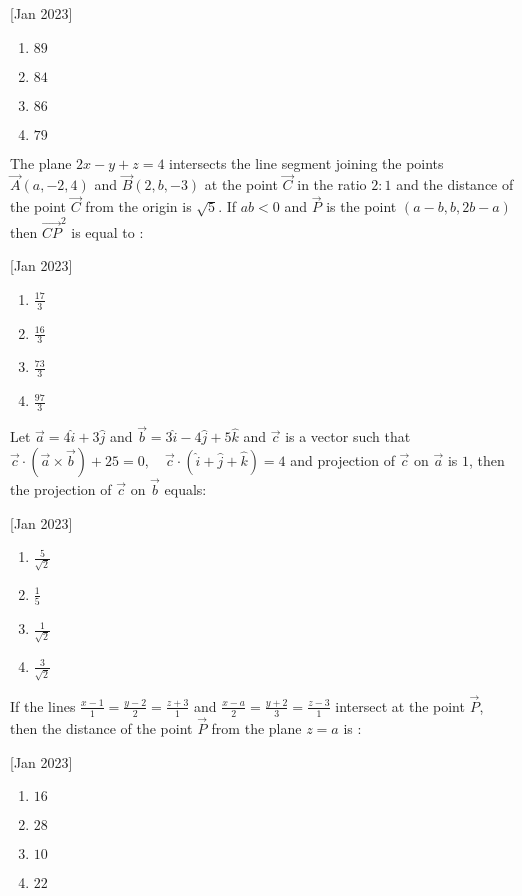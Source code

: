     \hfill[Jan 2023]
        \begin{enumerate}
            \item $89$
            \item $84$
            \item $86$
            \item $79$
        \end{enumerate}

    \item The plane $2x-y+z=4$ intersects the line segment joining the points $\vec{A}(a, -2, 4)$ and $\vec{B}(2, b, -3)$ at the point $\vec{C}$ in the ratio $2:1$ and the distance of the point $\vec{C}$ from the origin is $\sqrt{5}$. If $ab<0$ and $\vec{P}$ is the point $(a-b,b,2b-a)$ then $\vec{CP}^2$ is equal to :
    
    \hfill[Jan 2023]
        \begin{enumerate}
            \item $\frac{17}{3}$
            \item $\frac{16}{3}$
            \item $\frac{73}{3}$
            \item $\frac{97}{3}$
        \end{enumerate}

    \item Let $\vec{a} = 4\hat{i} + 3\hat{j}$ and $\vec{b} = 3\hat{i} - 4\hat{j} + 5\hat{k}$ and $\vec{c}$ is a vector such that $\vec{c} \cdot (\vec{a} \times \vec{b}) + 25 = 0, \quad \vec{c} \cdot (\hat{i} + \hat{j} + \hat{k}) = 4$ and projection of $\vec{c}$ on $\vec{a}$ is $1$, then the projection of $\vec{c}$ on $\vec{b}$ equals:
    
    \hfill[Jan 2023]
        \begin{enumerate}
            \item $\frac{5}{\sqrt{2}}$
            \item $\frac{1}{5}$
            \item $\frac{1}{\sqrt{2}}$
            \item $\frac{3}{\sqrt{2}}$
        \end{enumerate}

    \item If the lines $\frac{x-1}{1} = \frac{y-2}{2} = \frac{z+3}{1}$ and $\frac{x-a}{2} = \frac{y+2}{3} = \frac{z-3}{1}$ intersect at the point $\vec{P}$, then the distance of the point $\vec{P}$ from the plane $z=a$ is :
    
    \hfill[Jan 2023]
        \begin{enumerate}
            \item $16$
            \item $28$
            \item $10$
            \item $22$
        \end{enumerate}

